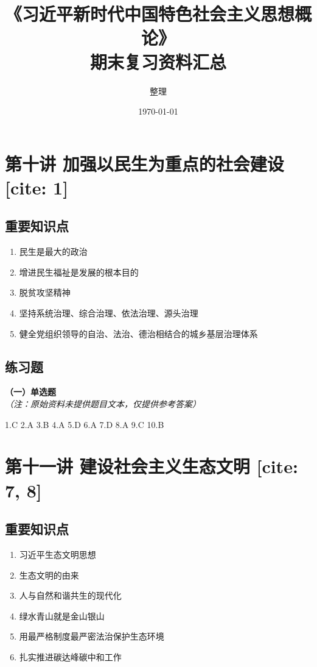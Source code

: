 \documentclass[a4paper,11pt]{ctexart}
\title{\textbf{《习近平新时代中国特色社会主义思想概论》\\期末复习资料汇总}}
\author{整理}
\date{\today}
\begin{document}
\maketitle


\section{第十讲 加强以民生为重点的社会建设 [cite: 1]}

\subsection{重要知识点}
\begin{enumerate}
    \item 民生是最大的政治
    \item 增进民生福祉是发展的根本目的
    \item 脱贫攻坚精神
    \item 坚持系统治理、综合治理、依法治理、源头治理
    \item 健全党组织领导的自治、法治、德治相结合的城乡基层治理体系
\end{enumerate}

\subsection{练习题}
\textbf{（一）单选题} \\
\textit{（注：原始资料未提供题目文本，仅提供参考答案）}

\begin{answerbox}
1.C \quad 2.A \quad 3.B \quad 4.A \quad 5.D \quad 6.A \quad 7.D \quad 8.A \quad 9.C \quad 10.B
\end{answerbox}

\newpage

\section{第十一讲 建设社会主义生态文明 [cite: 7, 8]}

\subsection{重要知识点}
\begin{enumerate}
    \item 习近平生态文明思想
    \item 生态文明的由来
    \item 人与自然和谐共生的现代化
    \item 绿水青山就是金山银山
    \item 用最严格制度最严密法治保护生态环境
    \item 扎实推进碳达峰碳中和工作
\end{enumerate}
\end{document}
